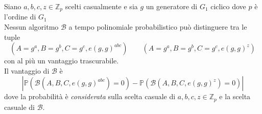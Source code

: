 \begin{assu}
Siano $a,b,c,z \in \mathbb{Z}_p$ scelti casualmente e sia $g$ un generatore di $G_1$ ciclico dove $p$ è l'ordine di $G_1$\\
Nessun algoritmo $\mathcal{B}$ a tempo polinomiale probabilistico può distinguere tra le tuple
\[ (A = g^a , B = g^b , C = g^c , e(g,g)^{abc}) \qquad (A = g^a , B = g^b , C = g^c , e(g,g)^{z}) \]
con al più un vantaggio trascurabile.\\
Il vantaggio di $\mathcal{B}$ è
\[ \left\lvert \mathbb{P}\left( \mathcal{B}(A,B,C,e(g,g)^{abc}) = 0 \right) - \mathbb{P}\left( \mathcal{B}(A,B,C,e(g,g)^{z}) = 0 \right) \right\rvert \]
dove la probabilità è \emph{considerata} sulla scelta casuale di $a,b,c,z \in \mathbb{Z}_p$ e la scelta casuale di $\mathcal{B}$.
\end{assu}